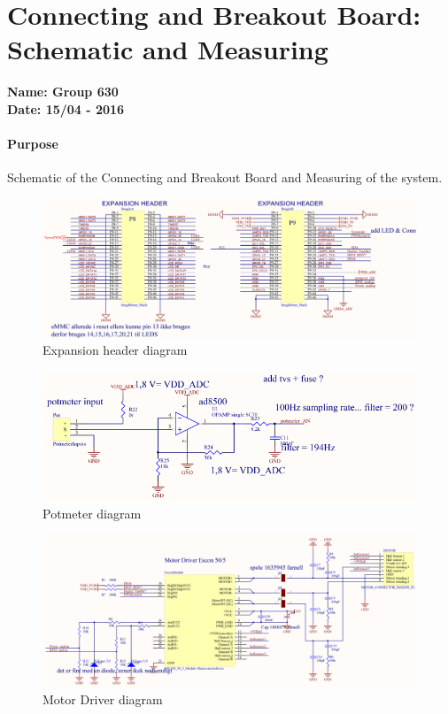 \chapter{Connecting and Breakout Board: Schematic and Measuring}\label{ConnectingBreakoutBoard} 
\textbf{Name: Group 630}\\
\textbf{Date: 15/04 - 2016}

\subsubsection{Purpose}
Schematic of the Connecting and Breakout Board and Measuring of the system.

\begin{figure}[H]
  \centering
	\includegraphics[scale=0.92]{figures/ExpanionHeader.pdf}
	\caption{Expansion header diagram}
	\label{labExpanionHeader}
\end{figure}\vspace{-5mm}


\begin{figure}[H]
	\centering
	\includegraphics[scale=0.92]{figures/Potmeter.pdf}
	\caption{Potmeter diagram}
	\label{labPotmeter}
\end{figure}\vspace{-5mm}


\begin{figure}[H]
	\centering
	\includegraphics[scale=0.92]{figures/MotorDriver.pdf}
	\caption{Motor Driver diagram}
	\label{labMotorDriver}
\end{figure}\vspace{-5mm}


